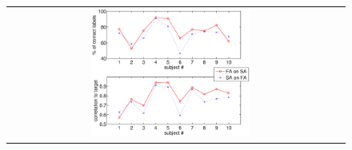 \documentclass{article}
\begin{document}

\begin{figure}[!ht] \centering
  \begin{tabular}{cc}
    \includegraphics[width=0.50\textwidth]{2on1.eps}
  \end{tabular}
\end{figure}
\end{document}
